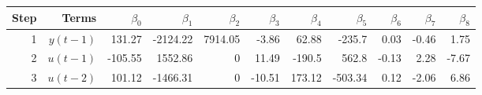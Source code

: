 \begin{tabular}{rrrrrrrrrrr}
Step & Terms & $\beta_{0}$ & $\beta_{1}$ & $\beta_{2}$ & $\beta_{3}$ & $\beta_{4}$ & $\beta_{5}$ & $\beta_{6}$ & $\beta_{7}$ & $\beta_{8}$ \\ 
\hline 
1 & $y(t-1)$ & 131.27 & -2124.22 & 7914.05 & -3.86 & 62.88 & -235.7 & 0.03 & -0.46 & 1.75 \\ 
2 & $u(t-1)$ & -105.55 & 1552.86 & 0 & 11.49 & -190.5 & 562.8 & -0.13 & 2.28 & -7.67 \\ 
3 & $u(t-2)$ & 101.12 & -1466.31 & 0 & -10.51 & 173.12 & -503.34 & 0.12 & -2.06 & 6.86 \\ 
\hline 
\end{tabular}